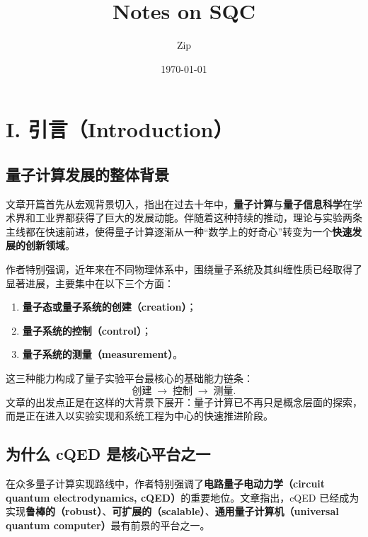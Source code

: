 \documentclass[12pt,a4paper,oneside]{ctexbook}
\title{Notes on SQC}
\author{Zip}
\date{\today}
\begin{document}
\frontmatter            %
\maketitle
\tableofcontents

\mainmatter             %






\section{I. 引言（Introduction）}

\subsection{量子计算发展的整体背景}

文章开篇首先从宏观背景切入，指出在过去十年中，\textbf{量子计算}与\textbf{量子信息科学}在学术界和工业界都获得了巨大的发展动能。伴随着这种持续的推动，理论与实验两条主线都在快速前进，使得量子计算逐渐从一种“数学上的好奇心”转变为一个\textbf{快速发展的创新领域}。

作者特别强调，近年来在不同物理体系中，围绕量子系统及其纠缠性质已经取得了显著进展，主要集中在以下三个方面：
\begin{enumerate}[leftmargin=2em]
    \item \textbf{量子态或量子系统的创建（creation）}；
    \item \textbf{量子系统的控制（control）}；
    \item \textbf{量子系统的测量（measurement）}。
\end{enumerate}

这三种能力构成了量子实验平台最核心的基础能力链条：
\[
\text{创建} \;\to\; \text{控制} \;\to\; \text{测量}.
\]
文章的出发点正是在这样的大背景下展开：量子计算已不再只是概念层面的探索，而是正在进入以实验实现和系统工程为中心的快速推进阶段。

\subsection{为什么 cQED 是核心平台之一}

在众多量子计算实现路线中，作者特别强调了\textbf{电路量子电动力学（circuit quantum electrodynamics, cQED）}的重要地位。文章指出，cQED 已经成为实现\textbf{鲁棒的（robust）}、\textbf{可扩展的（scalable）}、\textbf{通用量子计算机（universal quantum computer）}最有前景的平台之一。
\end{document}

